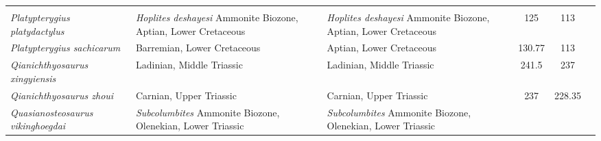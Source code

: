 \begin{longtabu}{>{\itshape}lXXSSl}
                                                             &
                                                             \cite{Kolb2009PAPS} \\                       
	Platypterygius platydactylus                         & \emph{Hoplites
        deshayesi} Ammonite Biozone, Aptian, Lower Cretaceous
                                                             & \emph{Hoplites
        deshayesi} Ammonite Biozone, Aptian, Lower Cretaceous
                                                             & 125
                                                             & 113
                                                             &
                                                             \cite{Broili1908NJFMGPB} \\                     
	Platypterygius sachicarum                            & Barremian, Lower
        Cretaceous
                                                             & Aptian, Lower
        Cretaceous
                                                             & 130.77
                                                             & 113
                                                             &
                                                             \cite{Paramo1997RI} \\                     
	Qianichthyosaurus xingyiensis                        & Ladinian, Middle
        Triassic
                                                             & Ladinian, Middle
        Triassic
                                                             & 241.5
                                                             & 237
                                                             &
                                                             \cite{Yang2013ASNUP} \\                       
	Qianichthyosaurus zhoui                              & Carnian, Upper
        Triassic
                                                             & Carnian, Upper
        Triassic
                                                             & 237
                                                             & 228.35
                                                             & \cite{Li1999CSB} \\                         
	Quasianosteosaurus vikinghoegdai                     &
        \emph{Subcolumbites} Ammonite Biozone, Olenekian, Lower Triassic
                                                             &
        \emph{Subcolumbites} Ammonite Biozone, Olenekian, Lower Triassic

\end{longtabu}
